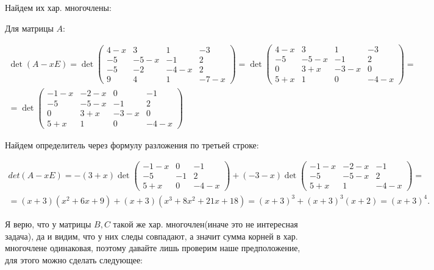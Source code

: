 \documentclass[11pt]{article}
\begin{document}
Найдем их хар. многочлены:

Для матрицы $A$:

$$
\begin{gathered}
\det(A - x E) = \det
\begin{pmatrix}
4 - x & 3 & 1 & -3 \\
-5 & -5 - x & -1 & 2 \\
-5 & -2 & -4 - x & 2 \\
9 & 4 & 1 & -7 - x
\end{pmatrix}
= \det
\begin{pmatrix}
4 - x & 3 & 1 & -3 \\
-5 & -5 - x & -1 & 2 \\
0 & 3 + x & -3 - x & 0 \\
5 + x & 1 & 0 & -4 - x
\end{pmatrix} = \\[10pt]
= \det
\begin{pmatrix}
-1 - x & -2 - x & 0 & -1 \\
-5     & -5 - x & -1 & 2 \\
0      & 3 + x  & -3 - x & 0 \\
5 + x  & 1      & 0      & -4 - x
\end{pmatrix}
\end{gathered}
$$

Найдем определитель через формулу разложения по третьей строке:

$$
\begin{gathered}
det(A - x E) = -(3 + x)\det
\begin{pmatrix}
-1 - x & 0 & -1 \\
-5 & -1 & 2 \\
5 + x & 0 & -4 - x
\end{pmatrix} + (-3 - x)\det
\begin{pmatrix}
-1 - x & -2 - x & -1 \\
-5 & -5 - x & 2 \\
5 + x  & 1 & -4 - x
\end{pmatrix} = \\[6pt]
= (x + 3)(x^2 + 6x + 9) + (x + 3)(x^3 + 8x^2 + 21x + 18) = (x + 3)^3 + (x + 3)^3(x + 2) = (x + 3)^4.
\end{gathered}
$$

Я верю, что у матрицы $B, C$ такой же хар. многочлен(иначе это не интересная задача), да и видим, что у них следы совпадают, а значит сумма корней в хар. многочлене одинаковая, поэтому давайте лишь проверим наше предположение, для этого можно сделать следующее:
\end{document}
